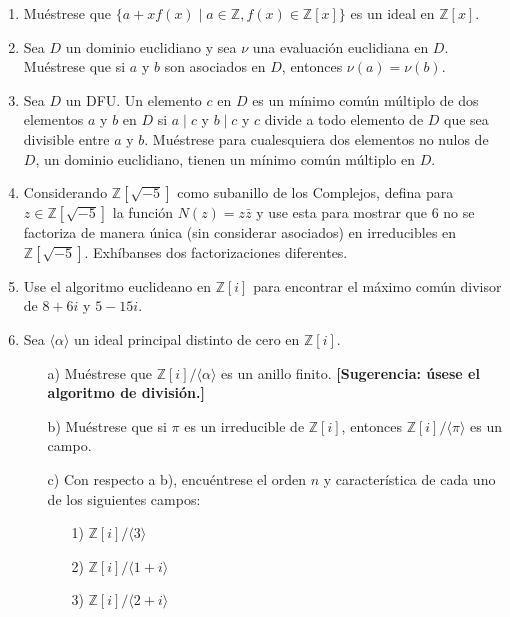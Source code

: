 \documentclass[12pt]{article}
\theoremstyle{definition}
\theoremstyle{remark}
\begin{document}
\begin{enumerate}
    \item Muéstrese que $\{a+ xf(x) \mid a \in \mathbb{Z}, f(x) \in \mathbb{Z}[x]\}$ es un ideal en $\mathbb{Z}[x]$.
    
    \item Sea $D$ un dominio euclidiano y sea $\nu$ una evaluación euclidiana en $D$. Muéstrese que si $a$ y $b$ son asociados en $D$, entonces $\nu(a) = \nu(b)$.
    
    \item Sea $D$ un DFU. Un elemento $c$ en $D$ es un mínimo común múltiplo de dos elementos $a$ y $b$ en $D$ si $a \mid c$ y $b \mid c$ y $c$ divide a todo elemento de $D$ que sea divisible entre $a$ y $b$. Muéstrese para cualesquiera dos elementos no nulos de $D$, un dominio euclidiano, tienen un mínimo común múltiplo en $D$.
    
    \item Considerando $\mathbb{Z}[\sqrt{-5}]$ como subanillo de los Complejos, defina para $z \in \mathbb{Z}[\sqrt{-5}]$ la función $N(z) = z\bar{z}$ y use esta para mostrar que $6$ no se factoriza de manera única (sin considerar asociados) en irreducibles en $\mathbb{Z}[\sqrt{-5}]$. Exhíbanses dos factorizaciones diferentes.
    
    \item Use el algoritmo euclideano en $\mathbb{Z}[i]$ para encontrar el máximo común divisor de $8 + 6i$ y $5 - 15i$.

    \item Sea $\langle \alpha \rangle$ un ideal principal distinto de cero en $\mathbb{Z}[i]$.
    
    \begin{enumerate}
        \item[a)] Muéstrese que $\mathbb{Z}[i]/\langle \alpha \rangle$ es un anillo finito. \textbf{[Sugerencia: úsese el algoritmo de división.]}
        
        \item[b)] Muéstrese que si $\pi$ es un irreducible de $\mathbb{Z}[i]$, entonces $\mathbb{Z}[i]/\langle \pi \rangle$ es un campo.
        
        \item[c)] Con respecto a b), encuéntrese el orden $n$ y característica de cada uno de los siguientes campos:
        
        \begin{enumerate}
            \item[1)] $\mathbb{Z}[i]/\langle 3 \rangle$
            \item[2)] $\mathbb{Z}[i]/\langle 1 + i \rangle$
            \item[3)] $\mathbb{Z}[i]/\langle 2 + i \rangle$
        \end{enumerate}
    \end{enumerate}


\end{enumerate}
\end{document}
